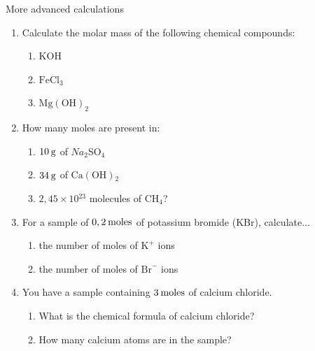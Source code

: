            \begin{exercises}{  More advanced calculations
      }
            \nopagebreak
      \label{m38717*id279756}\begin{enumerate}[noitemsep, label=\textbf{\arabic*}. ] 
            \label{m38717*uid47}\item Calculate the molar mass of the following chemical compounds:
\label{m38717*id279772}\begin{enumerate}[noitemsep, label=\textbf{\alph*}. ] 
            \label{m38717*uid48}\item $\mathrm{KOH}$
\label{m38717*uid49}\item $\mathrm{FeCl}{}_{3}$\label{m38717*uid50}\item ${\mathrm{Mg\left(OH\right)}}_{2}$\end{enumerate}
                \label{m38717*uid51}\item How many moles are present in:
\label{m38717*id279848}\begin{enumerate}[noitemsep, label=\textbf{\alph*}. ] 
            \label{m38717*uid52}\item $10\phantom{\rule{2pt}{0ex}}\mathrm{g}$ of $Na{}_{2}$SO${}_{4}$\label{m38717*uid53}\item $34\phantom{\rule{2pt}{0ex}}\mathrm{g}$ of $\mathrm{Ca\left(OH\right)}{}_{2}$\label{m38717*uid54}\item $2,45\ensuremath{\times}10{}^{23}$ molecules of $\mathrm{CH}{}_{4}$?
\end{enumerate}
                \label{m38717*uid55}\item For a sample of $0,2\phantom{\rule{2pt}{0ex}}\mathrm{moles}$ of potassium bromide ($\mathrm{KBr}$), calculate...
\label{m38717*id279964}\begin{enumerate}[noitemsep, label=\textbf{\alph*}. ] 
            \label{m38717*uid56}\item the number of moles of ${\mathrm{K}}^{+}$ ions
\label{m38717*uid57}\item the number of moles of ${\mathrm{Br}}^{-}$ ions
\end{enumerate}
                \label{m38717*uid58}\item You have a sample containing $3\phantom{\rule{2pt}{0ex}}\mathrm{moles}$ of calcium chloride.
\label{m38717*id280031}\begin{enumerate}[noitemsep, label=\textbf{\alph*}. ] 
            \label{m38717*uid59}\item What is the chemical formula of calcium chloride?
\label{m38717*uid60}\item How many calcium atoms are in the sample?

\end{enumerate}
\end{enumerate}
\end{exercises}
